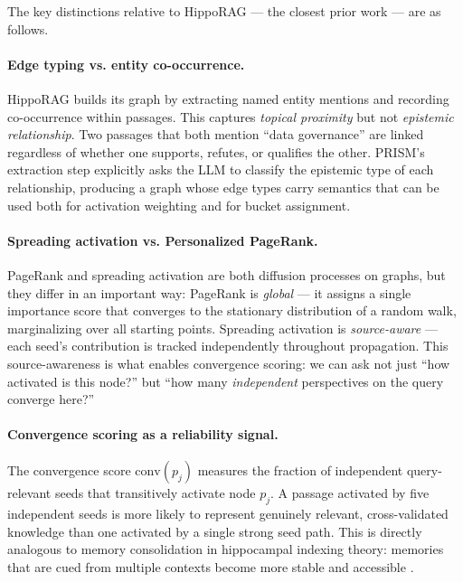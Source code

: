 \documentclass[11pt,a4paper]{article}
\begin{document}
The key distinctions relative to HippoRAG — the closest prior work —
are as follows.

\paragraph{Edge typing vs. entity co-occurrence.}
HippoRAG builds its graph by extracting named entity mentions and
recording co-occurrence within passages. This captures \emph{topical proximity}
but not \emph{epistemic relationship}. Two passages that both mention
\enquote{data governance} are linked regardless of whether one supports,
refutes, or qualifies the other. PRISM's extraction step explicitly asks
the LLM to classify the epistemic type of each relationship,
producing a graph whose edge types carry semantics that can be used
both for activation weighting and for bucket assignment.

\paragraph{Spreading activation vs. Personalized PageRank.}
PageRank and spreading activation are both diffusion processes on graphs,
but they differ in an important way: PageRank is \emph{global} — it
assigns a single importance score that converges to the stationary
distribution of a random walk, marginalizing over all starting points.
Spreading activation is \emph{source-aware} — each seed's contribution
is tracked independently throughout propagation. This source-awareness
is what enables convergence scoring: we can ask not just
\enquote{how activated is this node?} but \enquote{how many
\emph{independent} perspectives on the query converge here?}

\paragraph{Convergence scoring as a reliability signal.}
The convergence score $\text{conv}(p_j)$ measures the fraction of
independent query-relevant seeds that transitively activate node $p_j$.
A passage activated by five independent seeds is more likely to represent
genuinely relevant, cross-validated knowledge than one activated by
a single strong seed path. This is directly analogous to memory
consolidation in hippocampal indexing theory: memories that are cued
from multiple contexts become more stable and accessible
\citep{mcclelland1995complementary}.

\end{document}
